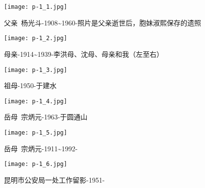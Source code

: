 
\begin{figure}
    \begin{center}
        \texttt{[image: p-1\_1.jpg]}
        \caption{父亲~杨光斗-1908\textasciitilde{}1960-照片是父亲逝世后，胞妹淑熙保存的遗照}
    \end{center}
\end{figure}

\clearpage


\begin{figure}
    \begin{center}
        \texttt{[image: p-1\_2.jpg]}
        \caption{母亲-1914\textasciitilde{}1939-李洪母、沈母、母亲和我（左至右）}
    \end{center}
\end{figure}

\clearpage


\begin{figure}
    \begin{center}
        \texttt{[image: p-1\_3.jpg]}
        \caption{祖母-1950-于建水}
    \end{center}
\end{figure}

\clearpage


\begin{figure}
    \begin{center}
        \texttt{[image: p-1\_4.jpg]}
        \caption{岳母~宗炳元-1963-于圆通山}
    \end{center}
\end{figure}

\clearpage


\begin{figure}
    \begin{center}
        \texttt{[image: p-1\_5.jpg]}
        \caption{岳母~宗炳元-1911\textasciitilde{}1992-}
    \end{center}
\end{figure}

\clearpage


\begin{figure}
    \begin{center}
        \texttt{[image: p-1\_6.jpg]}
        \caption{昆明市公安局一处工作留影-1951-}
    \end{center}
\end{figure}

\clearpage


